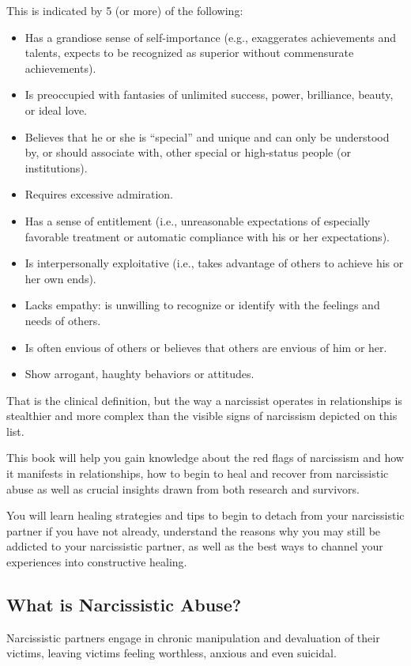 \documentclass[oneside]{book}
\numberwithin{equation}{section}
\begin{document}
This is indicated by 5 (or more) of the following:
\begin{itemize}
    \item Has a grandiose sense of self-importance (e.g., exaggerates achievements and talents, expects to be recognized as superior without commensurate achievements).
    \item Is preoccupied with fantasies of unlimited success, power, brilliance, beauty, or ideal love.
    \item Believes that he or she is ``special'' and unique and can only be understood by, or should associate with, other special or high-status people (or institutions).
    \item Requires excessive admiration.
    \item Has a sense of entitlement (i.e., unreasonable expectations of especially favorable treatment or automatic compliance with his or her expectations).
    \item Is interpersonally exploitative (i.e., takes advantage of others to achieve his or her own ends).
    \item Lacks empathy: is unwilling to recognize or identify with the feelings and needs of others.
    \item Is often envious of others or believes that others are envious of him or her.
    \item Show arrogant, haughty behaviors or attitudes.
\end{itemize}
That is the clinical definition, but the way a narcissist operates in relationships is stealthier and more complex than the visible signs of narcissism depicted on this list.

This book will help you gain knowledge about the red flags of narcissism and how it manifests in relationships, how to begin to heal and recover from narcissistic abuse as well as crucial insights drawn from both research and survivors.

You will learn healing strategies and tips to begin to detach from your narcissistic partner if you have not already, understand the reasons why you may still be addicted to your narcissistic partner, as well as the best ways to channel your experiences into constructive healing.

\subsection{What is Narcissistic Abuse?}
Narcissistic partners engage in chronic manipulation and devaluation of their victims, leaving victims feeling worthless, anxious and even suicidal.
\end{document}
